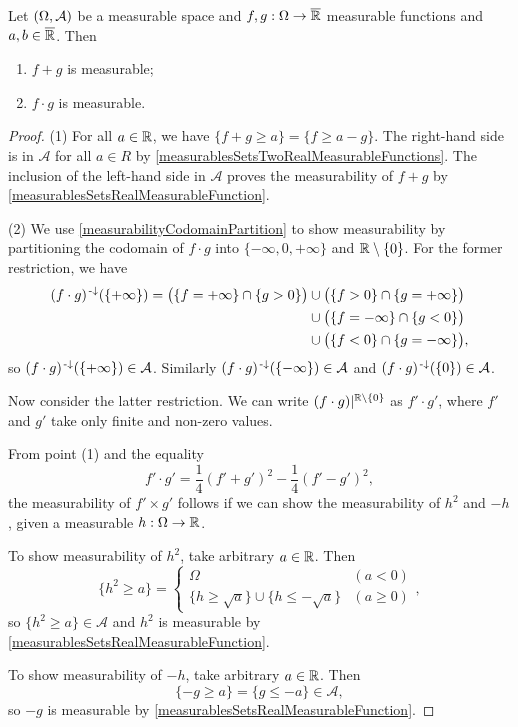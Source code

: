 \begin{proposition} \label{operationsOnRealMeasurableFunctions}
Let $\left( \Omega, \mathcal{A} \right)$ be a measurable space and $f,g: \Omega \to \overline{\mathbb{R}}$ measurable functions and $a,b\in \overline{\mathbb{R}}$. Then
\begin{enumerate}
\item $f+g$ is measurable;
\item $f\cdot g$ is measurable.
\end{enumerate}
\end{proposition}
\begin{proof}
(1) For all $a\in\mathbb{R}$, we have $\{f + g \geq a\} = \{f \geq a - g\}$. The right-hand side is in $\mathcal{A}$ for all $a\in R$ by \ref{measurablesSetsTwoRealMeasurableFunctions}. The inclusion of the left-hand side in $\mathcal{A}$ proves the measurability of $f+g$ by \ref{measurablesSetsRealMeasurableFunction}.

(2) We use \ref{measurabilityCodomainPartition} to show measurability by partitioning the codomain of $f\cdot g$ into $\{-\infty, 0, +\infty\}$ and $\mathbb{R}\setminus\{0\}$.
For the former restriction, we have
\begin{align*}
(f\cdot g)^{\text{\hspace{0.15em}-}\downarrow}(\{+\infty\}) = \big(\{f = +\infty\}\cap \{g > 0\}\big) &\cup \big(\{f > 0\} \cap \{g = +\infty\}\big) \\ &\cup \big(\{f = -\infty\}\cap \{g < 0\}\big) \\ &\cup \big(\{f < 0\} \cap \{g = -\infty\}\big),
\end{align*}
so $(f\cdot g)^{\text{\hspace{0.15em}-}\downarrow}(\{+\infty\})\in\mathcal{A}$. Similarly $(f\cdot g)^{\text{\hspace{0.15em}-}\downarrow}(\{-\infty\})\in\mathcal{A}$ and $(f\cdot g)^{\text{\hspace{0.15em}-}\downarrow}(\{0\})\in\mathcal{A}$.

Now consider the latter restriction. We can write $(f\cdot g)|^{\mathbb{R}\setminus\{0\}}$ as $f'\cdot g'$, where $f'$ and $g'$ take only finite and non-zero values.

From point (1) and the equality
\[ f'\cdot g' = \frac{1}{4}(f'+g')^2 - \frac{1}{4}(f'-g')^2, \]
the measurability of $f'\times g'$ follows if we can show the measurability of $h^2$ and $-h$, given a measurable $h:\Omega \to \mathbb{R}$.

To show measurability of $h^2$, take arbitrary $a\in\mathbb{R}$. Then
\[ \{h^2 \geq a\} = \begin{cases}
\Omega & (a < 0) \\
\{h \geq \sqrt{a}\} \cup \{h \leq -\sqrt{a}\} & (a \geq 0)
\end{cases}, \]
so $\{h^2 \geq a\} \in \mathcal{A}$ and $h^2$ is measurable by \ref{measurablesSetsRealMeasurableFunction}.

To show measurability of $-h$, take arbitrary $a\in\mathbb{R}$. Then
\[ \{ -g \geq a \} = \{g \leq -a\} \in \mathcal{A}, \]
so $-g$ is measurable by \ref{measurablesSetsRealMeasurableFunction}.
\end{proof}
